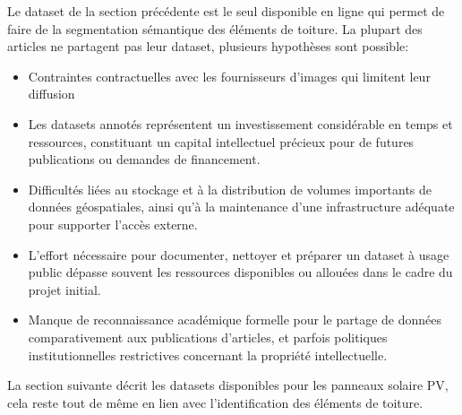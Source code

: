 \par{Le dataset de la section précédente est le seul disponible en ligne qui permet de faire de la segmentation sémantique des éléments de toiture. La plupart des articles ne partagent pas leur dataset, plusieurs hypothèses sont possible:}
\begin{itemize}
    \item Contraintes contractuelles avec les fournisseurs d'images qui limitent leur diffusion
    \item Les datasets annotés représentent un investissement considérable en temps et ressources, constituant un capital intellectuel précieux pour de futures publications ou demandes de financement.    
    \item Difficultés liées au stockage et à la distribution de volumes importants de données géospatiales, ainsi qu'à la maintenance d'une infrastructure adéquate pour supporter l'accès externe.
    \item L'effort nécessaire pour documenter, nettoyer et préparer un dataset à usage public dépasse souvent les ressources disponibles ou allouées dans le cadre du projet initial.
    \item Manque de reconnaissance académique formelle pour le partage de données comparativement aux publications d'articles, et parfois politiques institutionnelles restrictives concernant la propriété intellectuelle.
\end{itemize}
\par{La section suivante décrit les datasets disponibles pour les panneaux solaire PV, cela reste tout de même en lien avec l'identification des éléments de toiture.}

